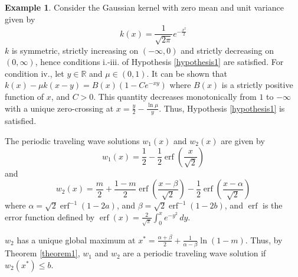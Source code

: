 \documentclass[11pt]{article}
\theoremstyle{definition}
\newtheorem{ex}[thm]{Example}
\numberwithin{equation}{section}
\numberwithin{thm}{section}
\DeclareMathOperator\erf{erf}
\begin{document}
\begin{ex} Consider the Gaussian kernel with zero mean and unit variance given by
$$ k(x) = \frac{1}{\sqrt{2\pi}} e^{-\frac{x^2}{2}} $$
$k$ is symmetric, strictly increasing on $(-\infty,0)$ and strictly decreasing on $(0,\infty)$, hence conditions i.-iii. of Hypothesis \ref{hypothesis1} are satisfied. For condition iv., let $y \in \mathbb R$ and $\mu\in(0,1)$. It can be shown that $k(x) - \mu k(x-y) = B(x)(1-Ce^{-xy})$ where $B(x)$ is a strictly positive function of $x$, and $C>0$. This quantity decreases monotonically from $1$ to $-\infty$ with a unique zero-crossing at $x=\frac{y}{2}-\frac{\ln \mu}{y}$. Thus, Hypothesis \ref{hypothesis1} is satisfied.

The periodic traveling wave solutions $w_1(x)$ and $w_2(x)$ are given by
\begin{equation}
w_1(x) = \frac{1}{2} - \frac{1}{2}\erf\left(\frac{x}{\sqrt{2}}\right)
\end{equation}
and
\begin{equation}
w_2(x)=  \frac{m}{2} + \frac{1-m}{2} \erf \left( \frac{x-\beta}{\sqrt 2}\right) - \frac{1}{2} \erf \left( \frac{x-\alpha}{\sqrt2} \right)
\end{equation}
where $\alpha=\sqrt{2}\erf^{-1}\left(1-2a\right)$, and $\beta=\sqrt{2}\erf^{-1}\left(1-2b\right)$, and $\erf$ is the error function defined by $\erf(x) =\frac{2}{\sqrt\pi}\int_0^x e^{-y^2}\,dy$.

$w_2$ has a unique global maximum at $x^*=\frac{\alpha+\beta}{2} + \frac{1}{\alpha-\beta}\ln\left(1-m\right)$. Thus, by Theorem \ref{theorem1}, $w_1$ and $w_2$ are a periodic traveling wave solution if $w_2(x^*)\leq b$.
\end{ex}
\end{document}
